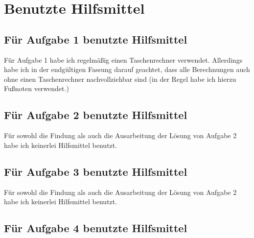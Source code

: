 \section{Benutzte Hilfsmittel}

\subsection*{Für Aufgabe 1 benutzte Hilfsmittel}

Für Aufgabe 1 habe ich regelmäßig einen Taschenrechner verwendet. Allerdings habe ich in der endgültigen Fassung 
darauf geachtet, dass alle Berechnungen auch ohne einen Taschenrechner nachvollziehbar sind (in der Regel habe 
ich hierzu Fußnoten verwendet.)

\subsection*{Für Aufgabe 2 benutzte Hilfsmittel}

Für sowohl die Findung als auch die Ausarbeitung der Lösung von Aufgabe 2 habe ich keinerlei Hilfsmittel benutzt.

\subsection*{Für Aufgabe 3 benutzte Hilfsmittel}

Für sowohl die Findung als auch die Ausarbeitung der Lösung von Aufgabe 2 habe ich keinerlei Hilfsmittel benutzt.

\subsection*{Für Aufgabe 4 benutzte Hilfsmittel}


